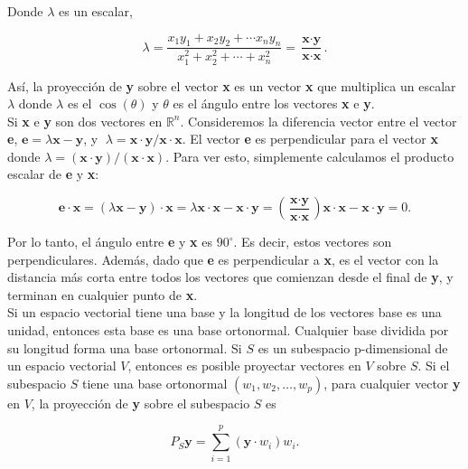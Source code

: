 Donde $\lambda$ es un escalar, 

\begin{tcolorbox}
    \begin{equation}
	\lambda=\dfrac{x_1y_1+x_2y_2+\cdots x_ny_n}{x_1^2+x_2^2 + \cdots + x_n^2}=\dfrac{\textbf{x}\cdot \textbf{y}}{\textbf{x}\cdot \textbf{x}}.
    \end{equation}
\end{tcolorbox}

Así, la proyección de \textbf{y} sobre el vector \textbf{x} es un vector \textbf{x} que multiplica un escalar $\lambda$ donde $\lambda$ es el $\cos(\theta)$ y $\theta$ es el ángulo entre los vectores \textbf{x} e \textbf{y}.\\

Si \textbf{x} e \textbf{y} son dos vectores en $\mathbb{R}^n$. Consideremos la diferencia vector entre el vector \textbf{e}, $\textbf{e}=\lambda \textbf{x}-\textbf{y}$, y $\;\lambda = \textbf{x}\cdot\textbf{y}/\textbf{x}\cdot \textbf{x}.$ El vector \textbf{e} es perpendicular para el vector \textbf{x} donde $\lambda=(\textbf{x}\cdot \textbf{y})/(\textbf{x}\cdot \textbf{x})$. Para ver esto, simplemente calculamos el producto escalar de \textbf{e} y \textbf{x}:

$$\textbf{e}\cdot \textbf{x} = (\lambda \textbf{x}-\textbf{y})\cdot\textbf{x}=\lambda \textbf{x}\cdot \textbf{x}-\textbf{x}\cdot \textbf{y}=\left(\dfrac{\textbf{x}\cdot \textbf{y}}{\textbf{x}\cdot \textbf{x}}\right)\textbf{x}\cdot \textbf{x}-\textbf{x}\cdot\textbf{y}=0.$$

Por lo tanto, el ángulo entre \textbf{e} y \textbf{x} es $90^\circ$. Es decir, estos vectores son perpendiculares. Además, dado que \textbf{e} es perpendicular a \textbf{x}, es el vector con la distancia más corta entre todos los vectores que comienzan desde el final de \textbf{y}, y terminan en cualquier punto de \textbf{x}.\\

Si un espacio vectorial tiene una base y la longitud de los vectores base es una unidad, entonces esta base es una base ortonormal. Cualquier base dividida por su longitud forma una base ortonormal. Si $S$ es un subespacio p-dimensional de un espacio vectorial $V$, entonces es posible proyectar vectores en $V$ sobre $S$. Si el subespacio $S$ tiene una base ortonormal $(w_1, w_2, \ldots , w_p)$, para cualquier vector \textbf{y} en $V$, la proyección de \textbf{y} sobre el subespacio $S$ es

\begin{equation}
    P_{S}\textbf{y}=\sum_{i=1}^p (\textbf{y}\cdot w_i)w_i.
\end{equation}

